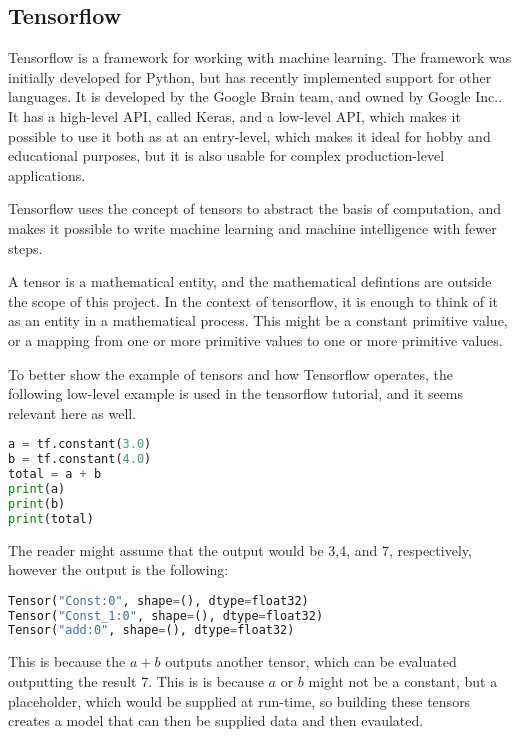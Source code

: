\subsection{Tensorflow}
Tensorflow is a framework for working with machine learning\cite{tensorflow2015-whitepaper}.
The framework was initially developed for Python, but has recently implemented support for other languages.
It is developed by the Google Brain team, and owned by Google Inc.\cite{tensorflow-attribution}.
It has a high-level API, called Keras, and a low-level API, which makes it possible to use it both as at an entry-level, which makes it ideal for hobby and educational purposes, but it is also usable for complex production-level applications.

Tensorflow uses the concept of tensors to abstract the basis of computation, and makes it possible to write machine learning and machine intelligence with fewer steps.

A tensor is a mathematical entity, and the mathematical defintions are outside the scope of this project.
In the context of tensorflow, it is enough to think of it as an entity in a mathematical process.
This might be a constant primitive value, or a mapping from one or more primitive values to one or more primitive values.

To better show the example of tensors and how Tensorflow operates, the following low-level example is used in the tensorflow tutorial, and it seems relevant here as well.

\begin{lstlisting}[language=Python,label=lis:TensorFlowPy1,caption=Example of a tensorflow program]
a = tf.constant(3.0)
b = tf.constant(4.0)
total = a + b
print(a)
print(b)
print(total)
\end{lstlisting}
The reader might assume that the output would be 3,4, and 7, respectively, however the output is the following:
\begin{lstlisting}[language=Python,label=lis:TensorFlowPy2,caption=Output of example \ref{lis:TensorFlowPy2}]
Tensor("Const:0", shape=(), dtype=float32)
Tensor("Const_1:0", shape=(), dtype=float32)
Tensor("add:0", shape=(), dtype=float32)
\end{lstlisting}
This is because the $ a + b $ outputs another tensor, which can be evaluated outputting the result 7.
This is is because $a$ or $b$ might not be a constant, but a placeholder, which would be supplied at run-time, so building these tensors creates a model that can then be supplied data and then evaulated.

